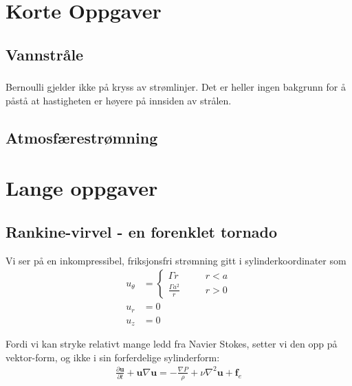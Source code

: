 \documentclass[12p,a4paper]{article}
\renewcommand{\b}{\boldsymbol}
\begin{document}
\section{Korte Oppgaver}
\subsection{Vannstråle}
\subsubsection{}
Bernoulli gjelder ikke på kryss av strømlinjer. Det er heller ingen bakgrunn for å påstå at hastigheten er høyere på innsiden av strålen.


\subsubsection{}



\subsection{Atmosfærestrømning}



\section{Lange oppgaver}
\subsection{Rankine-virvel - en forenklet tornado}
Vi ser på en inkompressibel, friksjonsfri strømning gitt i sylinderkoordinater som
\begin{align*}
  u_\theta &= \begin{cases}
    \Gamma r \qquad &r < a \\
    \frac{\Gamma a^2}{r} &r > 0
  \end{cases}\\
  u_r &= 0 \\
  u_z & = 0
\end{align*}

Fordi vi kan stryke relativt mange ledd fra Navier Stokes, setter vi den opp på vektor-form, og ikke i sin forferdelige sylinderform:
\begin{align*}
    \frac{\partial \b u}{\partial t} + \b u \nabla \b u = - \frac{\nabla P}{\rho} + \nu \nabla^2 \b u + \b f_e
\end{align*}
\end{document}
